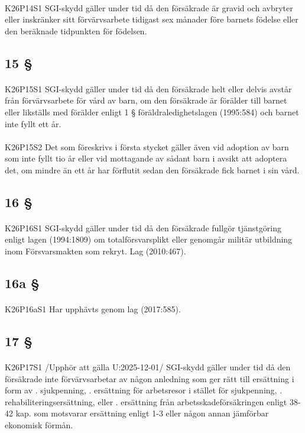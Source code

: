\documentclass[a4paper,notitlepage,openany,10pt]{book}
\begin{document}
\paragraph*{}
{\tiny K26P14S1}
SGI-skydd gäller under tid då den försäkrade är gravid och avbryter eller inskränker sitt förvärvsarbete tidigast sex månader före barnets födelse eller den beräknade tidpunkten för födelsen.
\subsection*{15 §}
\paragraph*{}
{\tiny K26P15S1}
SGI-skydd gäller under tid då den försäkrade helt eller delvis avstår från förvärvsarbete för vård av barn, om den försäkrade är förälder till barnet eller likställs med förälder enligt 1 § föräldraledighetslagen (1995:584) och barnet inte fyllt ett år.
\paragraph*{}
{\tiny K26P15S2}
Det som föreskrivs i första stycket gäller även vid adoption av barn som inte fyllt tio år eller vid mottagande av sådant barn i avsikt att adoptera det, om mindre än ett år har förflutit sedan den försäkrade fick barnet i sin vård.
\subsection*{16 §}
\paragraph*{}
{\tiny K26P16S1}
SGI-skydd gäller under tid då den försäkrade fullgör tjänstgöring enligt lagen (1994:1809) om totalförsvarsplikt eller genomgår militär utbildning inom Försvarsmakten som rekryt.
Lag (2010:467).
\subsection*{16a §}
\paragraph*{}
{\tiny K26P16aS1}
Har upphävts genom
lag (2017:585).
\subsection*{17 §}
\paragraph*{}
{\tiny K26P17S1}
/Upphör att gälla U:2025-12-01/
SGI-skydd gäller under tid då den försäkrade inte förvärvsarbetar av någon anledning som ger rätt till ersättning i form av
. sjukpenning,
. ersättning för arbetsresor i stället för sjukpenning,
. rehabiliteringsersättning, eller
. ersättning från arbetsskadeförsäkringen enligt 38-42 kap. som motsvarar ersättning enligt 1-3 eller någon annan jämförbar ekonomisk förmån.
\end{document}
